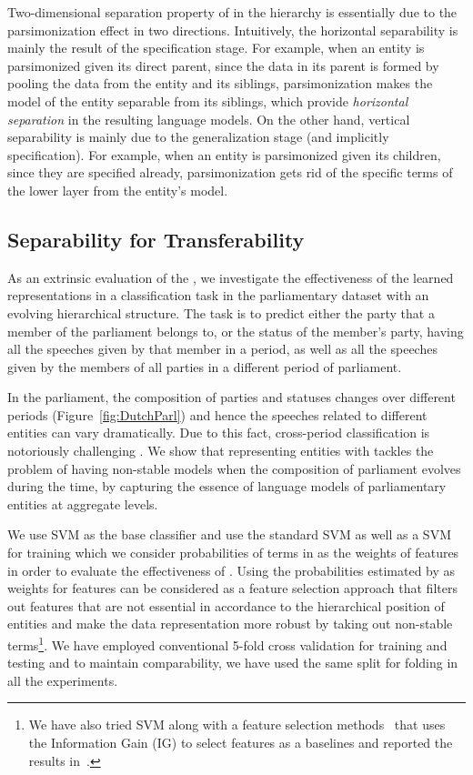 Two\:-\:dimensional separation property of \achswlm in the hierarchy is essentially due to the parsimonization effect in two directions. 
Intuitively, the horizontal separability is mainly the result of the specification stage. For example, when an entity is parsimonized given its direct parent, since the data in its parent is formed by pooling the data from the entity and its siblings, parsimonization makes the model of the entity separable from its siblings, which provide \emph{horizontal separation} in the resulting language models. On the other hand, vertical separability is mainly due to the generalization stage (and implicitly specification). For example, when an entity is parsimonized given its children, since they are specified already, parsimonization gets rid of the specific terms of the lower layer from the entity's model.


\subsection{Separability for Transferability}
\label{subsec:Separability}
As an extrinsic evaluation of the \hswlms, we investigate the effectiveness of the learned representations in a classification task in the parliamentary dataset with an evolving hierarchical structure. The task is to predict either the party that a member of the parliament belongs to, or the status of the member's party, having all the speeches given by that member in a period,  as well as all the speeches given by the members of all parties in a different period of parliament.

In the parliament, the composition of parties and statuses changes over different periods (Figure~\ref{fig:DutchParl}) and hence the speeches related to different entities can vary dramatically.  Due to this fact, cross-period classification is notoriously challenging \citep{Hirst:2014,yu:2008}.  We show that representing entities with \achswlm tackles the problem of having non-stable models when the composition of parliament evolves during the time, by capturing the essence of language models of parliamentary entities at aggregate levels. 

We use SVM as the base classifier and use the standard SVM as well as a SVM for training which we consider probabilities of terms in \achswlm as the weights of features in order to evaluate the effectiveness of \achswlm. Using the probabilities estimated by \achswlm as weights for features can be considered as a feature selection approach that filters out features that are not essential in accordance to the hierarchical position of entities and make the data representation more robust by taking out non-stable terms\footnote{We have also tried SVM along with a feature selection methods~\citep{Forman:2003,brank:2002} that uses the Information Gain (IG) to select features as a baselines and reported the results in~\citep{Dehghani:2016:ICTIR}.}.
We have employed conventional 5-fold cross validation for training and testing and to maintain comparability, we have used the same split for folding in all the experiments.

